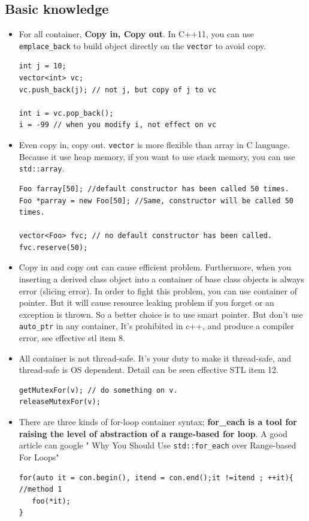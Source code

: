 \documentclass[a4paper,11pt,twoside]{book}
\begin{document}
\subsection{Basic knowledge}
\begin{itemize}

\item For all container, \textbf{Copy in, Copy out}. In C++11, you can use \texttt{emplace\_back} to build object directly on the \texttt{vector} to avoid copy.
\begin{lstlisting}[numbers=none]
int j = 10;
vector<int> vc;
vc.push_back(j); // not j, but copy of j to vc

int i = vc.pop_back(); 
i = -99 // when you modify i, not effect on vc
\end{lstlisting}

\item Even copy in, copy out. \texttt{vector} is more flexible than array in C language. Because it use heap memory, if you want to use stack memory, you can use \texttt{std::array}.
\begin{lstlisting}[numbers=none]
Foo farray[50]; //default constructor has been called 50 times.
Foo *parray = new Foo[50]; //Same, constructor will be called 50 times.

vector<Foo> fvc; // no default constructor has been called.
fvc.reserve(50);
\end{lstlisting}



\item Copy in and copy out can cause efficient problem. Furthermore, when you inserting a derived class object into a container of base class objects is always error (slicing error). In order to fight this problem, you can use container of pointer. But it will cause resource leaking problem if you forget or an exception is thrown. So a better choice is to use smart pointer. But don't use \texttt{auto\_ptr} in any container, It's prohibited in c++, and produce a compiler error, see effective stl item 8.

\item All container is not thread-safe. It's your duty to make it thread-safe, and thread-safe is OS dependent. Detail can be seen effective STL item 12.
\begin{lstlisting}[numbers=none]
getMutexFor(v); // do something on v.
releaseMutexFor(v);
\end{lstlisting}

\item There are three kinds of for-loop container syntax; \textbf{for\_each is a tool for raising the level of abstraction of a range-based for loop}. A good article can google " Why You Should Use \texttt{std::for\_each} over Range-based For Loops"
\begin{lstlisting}
for(auto it = con.begin(), itend = con.end();it !=itend ; ++it){ //method 1
   foo(*it);
}


\end{lstlisting}
\end{itemize}
\end{document}
